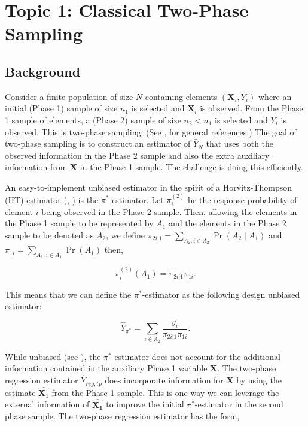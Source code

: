 \documentclass[12pt]{article}
\renewcommand{\bf}[1]{\mathbf{#1}}
\begin{document}
\section{Topic 1: Classical Two-Phase Sampling}

\subsection{Background}

Consider a finite population of size $N$ containing elements $(\bf X_i, Y_i)$ where
an initial (Phase 1) sample of size $n_1$ is selected and $\bf X_i$ is observed.
From the Phase 1 sample of elements, a (Phase 2) sample of size $n_2 < n_1$ is
selected and $Y_i$ is observed. This is two-phase sampling. (See 
\cite{fuller2009sampling}, \cite{kim2024statistics} for general references.) The
goal of two-phase sampling is to construct an estimator of $\bar Y_N$ 
that uses both the observed information in the Phase 2 sample and also the extra
auxiliary information from $\bf X$ in the Phase 1 sample.
The challenge is doing this efficiently.

An easy-to-implement unbiased estimator in the spirit of a Horvitz-Thompson (HT)
estimator (\cite{horvitz1952generalization}, \cite{narain1951sampling}) is the
$\pi^*$-estimator. Let $\pi_i^{(2)}$ be the response probability of element $i$
being observed in the Phase 2 sample. Then, allowing the elements in the Phase 1
sample to be represented by $A_1$ and the elements in the Phase 2 sample to be
denoted as $A_2$,
we define $\pi_{2i | 1} = \sum_{A_2: i \in A_2} \Pr(A_2 \mid A_1)$ and
$\pi_{1i} = \sum_{A_1: i \in A_1} \Pr(A_1)$ then,

$$ \pi_i^{(2)}(A_1) = \pi_{2i | 1} \pi_{1i}.$$

This means that we can define the $\pi^*$-estimator as the following design
unbiased estimator:

$$ \hat Y_{\pi^*} = \sum_{i \in A_2} \frac{y_i}{\pi_{2i | 1} \pi_{1i}}.$$

While unbiased (see \cite{kim2024statistics}), the $\pi^*$-estimator does not
account for the additional information contained in the auxiliary Phase 1
variable $\bf X$. The two-phase regression estimator $\hat Y_{reg, tp}$ does
incorporate information for $\bf X$ by using the estimate $\hat{\bf X_1}$ from
the Phase 1 sample. This is one way we can leverage the external information of 
$\hat{\bf{X_1}}$ to improve the initial $\pi^*$-estimator in the second phase
sample. The two-phase regression estimator has the form,
\end{document}
